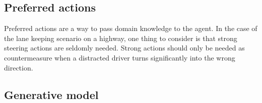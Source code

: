 

\subsection{Preferred actions}
\label{sec:preferred_actions}

Preferred actions are a way to pass domain knowledge to the agent. In the case of the lane keeping scenario on a highway, one thing to consider is that strong steering actions are seldomly needed. Strong actions should only be needed as countermeasure when a distracted driver turns significantly into the wrong direction. 




\subsection{Generative model}
\label{sec:gen_model}

